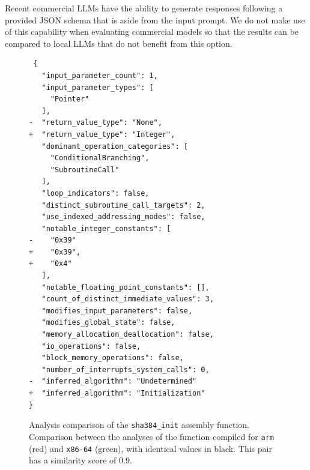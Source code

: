 Recent commercial LLMs have the ability to generate responses following a provided JSON schema that is aside from the input prompt.
We do not make use of this capability when evaluating commercial models so that the results can be compared to local LLMs
that do not benefit from this option.

\begin{figure}
\centering
\begin{minipage}{0.95\linewidth}
\begin{verbatim}
 {
   "input_parameter_count": 1,
   "input_parameter_types": [
     "Pointer"
   ],
-  "return_value_type": "None",
+  "return_value_type": "Integer",
   "dominant_operation_categories": [
     "ConditionalBranching",
     "SubroutineCall"
   ],
   "loop_indicators": false,
   "distinct_subroutine_call_targets": 2,
   "use_indexed_addressing_modes": false,
   "notable_integer_constants": [
-    "0x39"
+    "0x39",
+    "0x4"
   ],
   "notable_floating_point_constants": [],
   "count_of_distinct_immediate_values": 3,
   "modifies_input_parameters": false,
   "modifies_global_state": false,
   "memory_allocation_deallocation": false,
   "io_operations": false,
   "block_memory_operations": false,
   "number_of_interrupts_system_calls": 0,
-  "inferred_algorithm": "Undetermined"
+  "inferred_algorithm": "Initialization"
}
\end{verbatim}

\caption{Analysis comparison of the \texttt{sha384\_init} assembly function. Comparison between the analyses of the function compiled 
for \texttt{arm} (red) and \texttt{x86-64} (green), with identical values in black. This pair has a similarity score of \(0.9\).}
\label{feature-diff}
\end{minipage}
\end{figure}


